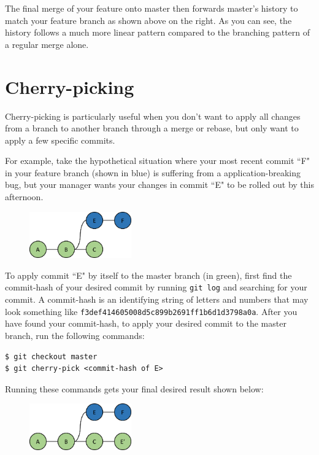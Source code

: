 \documentclass{amsart}
\begin{document}
The final merge of your feature onto master then forwards master's history to match your feature branch as shown above on the right.  As you can see, the history follows a much more linear pattern compared to the branching pattern of a regular merge alone.

\newpage
\section*{Cherry-picking}

Cherry-picking is particularly useful when you don't want to apply all changes from a branch to another branch through a merge or rebase, but only want to apply a few specific commits.

For example, take the hypothetical situation where your most recent commit ``F" in your feature branch (shown in blue) is suffering from a application-breaking bug, but your manager wants your changes in commit ``E" to be rolled out by this afternoon.

\begin{figure}[h]
\center
\includegraphics[height=2cm]{feature}
\end{figure}

To apply commit ``E" by itself to the master branch (in green), first find the commit-hash of your desired commit by running \texttt{git log} and searching for your commit.  A commit-hash is an identifying string of letters and numbers that may look something like \texttt{f3def414605008d5c899b2691ff1b6d1d3798a0a}.  After you have found your commit-hash, to apply your desired commit to the master branch, run the following commands:
\begin{verbatim}
$ git checkout master
$ git cherry-pick <commit-hash of E>
\end{verbatim}

Running these commands gets your final desired result shown below:

\begin{figure}[h]
\center
\includegraphics[height=2cm]{cherrypick}
\end{figure}
\end{document}
